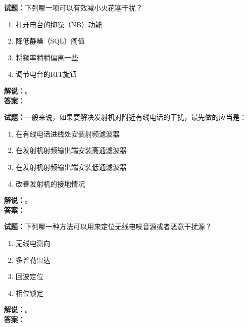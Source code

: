\documentclass{ctexbook}
\begin{document}
\vspace{\baselineskip}

\noindent\textbf{试题：}下列哪一项可以有效减小火花塞干扰？
\begin{enumerate}[leftmargin=3em]
  \item 打开电台的抑噪（NB）功能
  \item 降低静噪（SQL）阀值
  \item 将频率稍稍偏离一些
  \item 调节电台的RIT旋钮
\end{enumerate}
\noindent\textbf{解说：}\textbf{}。\\\noindent\textbf{答案：}

\vspace{\baselineskip}

\noindent\textbf{试题：}一般来说，如果要解决发射机对附近有线电话的干扰，最先做的应当是：
\begin{enumerate}[leftmargin=3em]
  \item 在有线电话进线处安装射频滤波器
  \item 在发射机射频输出端安装高通滤波器
  \item 在发射机射频输出端安装低通滤波器
  \item 改善发射机的接地情况
\end{enumerate}
\noindent\textbf{解说：}\textbf{}。\\\noindent\textbf{答案：}

\vspace{\baselineskip}

\noindent\textbf{试题：}下列哪一种方法可以用来定位无线电噪音源或者恶意干扰源？
\begin{enumerate}[leftmargin=3em]
  \item 无线电测向
  \item 多普勒雷达
  \item 回波定位
  \item 相位锁定
\end{enumerate}
\noindent\textbf{解说：}\textbf{}。\\\noindent\textbf{答案：}





%


\end{document}
